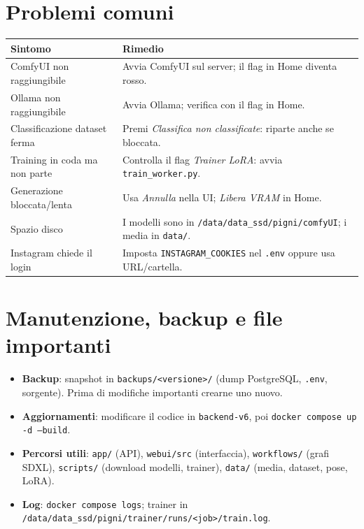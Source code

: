 \documentclass[11pt,a4paper]{article}
\begin{document}
\section{Problemi comuni}
\begin{table}[h]
\centering
\begin{tabularx}{\textwidth}{l X}
\toprule
\textbf{Sintomo} & \textbf{Rimedio} \\
\midrule
ComfyUI non raggiungibile & Avvia ComfyUI sul server; il flag in Home diventa rosso. \\
Ollama non raggiungibile & Avvia Ollama; verifica con il flag in Home. \\
Classificazione dataset ferma & Premi \emph{Classifica non classificate}: riparte anche se bloccata. \\
Training in coda ma non parte & Controlla il flag \emph{Trainer LoRA}: avvia \texttt{train\_worker.py}. \\
Generazione bloccata/lenta & Usa \emph{Annulla} nella UI; \emph{Libera VRAM} in Home. \\
Spazio disco & I modelli sono in \texttt{/data/data\_ssd/pigni/comfyUI}; i media in \texttt{data/}. \\
Instagram chiede il login & Imposta \texttt{INSTAGRAM\_COOKIES} nel \texttt{.env} oppure usa URL/cartella. \\
\bottomrule
\end{tabularx}
\end{table}

\section{Manutenzione, backup e file importanti}
\begin{itemize}
  \item \textbf{Backup}: snapshot in \texttt{backups/<versione>/} (dump PostgreSQL, \texttt{.env}, sorgente). Prima di modifiche importanti crearne uno nuovo.
  \item \textbf{Aggiornamenti}: modificare il codice in \texttt{backend-v6}, poi \texttt{docker compose up -d --build}.
  \item \textbf{Percorsi utili}: \texttt{app/} (API), \texttt{webui/src} (interfaccia), \texttt{workflows/} (grafi SDXL), \texttt{scripts/} (download modelli, trainer), \texttt{data/} (media, dataset, pose, LoRA).
  \item \textbf{Log}: \texttt{docker compose logs}; trainer in \texttt{/data/data\_ssd/pigni/trainer/runs/<job>/train.log}.
\end{itemize}
\end{document}
